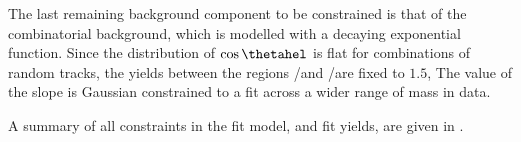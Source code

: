 

The last remaining background component to be constrained is that of the combinatorial background,
which is modelled with a decaying exponential function.
Since the distribution of $\cos\thetahel$ is flat for combinations of random tracks, the yields
between the regions \rA/\rC and \rB/\rD  are fixed to $1.5$,
The value of the slope is Gaussian constrained to a fit across a wider range of mass in data.

A summary of all constraints in the fit model, and fit yields, are given in
.

